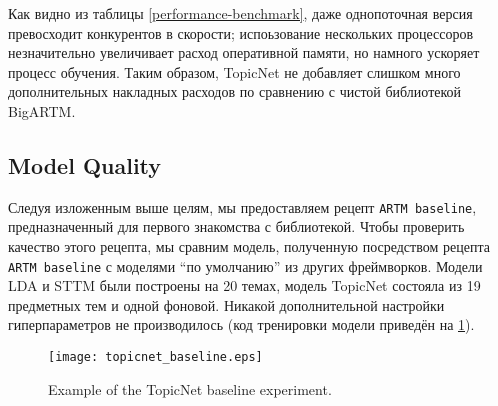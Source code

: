 Как видно из таблицы \ref{performance-benchmark}, даже однопоточная версия превосходит конкурентов в скорости; испоьзование нескольких процессоров незначительно увеличивает расход оперативной памяти, но намного ускоряет процесс обучения. Таким образом, TopicNet не добавляет слишком много дополнительных накладных расходов по сравнению с чистой библиотекой BigARTM.

\subsection{Model Quality} 

Следуя изложенным выше целям, мы предоставляем рецепт \texttt{ARTM baseline}, предназначенный для первого знакомства с библиотекой. Чтобы проверить качество этого рецепта, мы сравним модель, полученную посредством рецепта \texttt{ARTM baseline} с моделями ``по умолчанию'' из других фреймворков. Модели LDA и STTM были построены на 20 темах, модель TopicNet состояла из 19 предметных тем и одной фоновой. Никакой дополнительной настройки гиперпараметров не производилось (код тренировки модели приведён на \ref{topicnet_baseline}). 



\begin{figure}[!ht]
    \centering
    \texttt{[image: topicnet\_baseline.eps]}
    \caption{Example of the TopicNet baseline experiment.}
\label{topicnet_baseline}
\end{figure}


